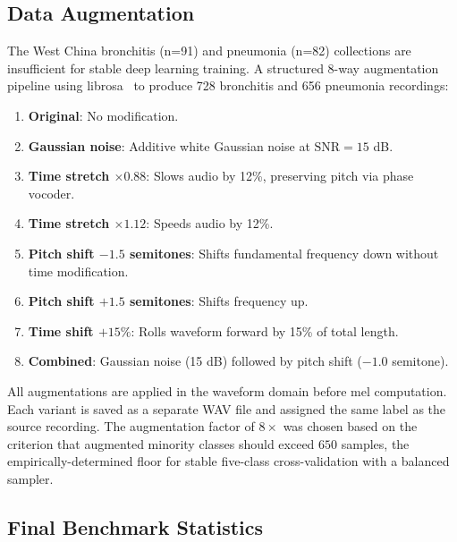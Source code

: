 \documentclass[10pt,journal,compsoc]{IEEEtran}
\begin{document}
\subsection{Data Augmentation}
\label{sec:augmentation}

The West China bronchitis (n=91) and pneumonia (n=82) collections are
insufficient for stable deep learning training. A structured
8-way augmentation pipeline using librosa~\cite{librosa} to produce
728 bronchitis and 656 pneumonia recordings:

\begin{enumerate}[label=(\arabic*)]
    \item \textbf{Original}: No modification.
    \item \textbf{Gaussian noise}: Additive white Gaussian noise at
          $\mathrm{SNR} = 15$ dB.
    \item \textbf{Time stretch $\times 0.88$}: Slows audio by 12\%,
          preserving pitch via phase vocoder.
    \item \textbf{Time stretch $\times 1.12$}: Speeds audio by 12\%.
    \item \textbf{Pitch shift $-1.5$ semitones}: Shifts fundamental
          frequency down without time modification.
    \item \textbf{Pitch shift $+1.5$ semitones}: Shifts frequency up.
    \item \textbf{Time shift $+15\%$}: Rolls waveform forward by 15\%
          of total length.
    \item \textbf{Combined}: Gaussian noise (15 dB) followed by
          pitch shift ($-1.0$ semitone).
\end{enumerate}

All augmentations are applied in the waveform domain before mel computation.
Each variant is saved as a separate WAV file and assigned the same label
as the source recording. The augmentation factor of $8\times$ was chosen
based on the criterion that augmented minority classes should exceed
$650$ samples, the empirically-determined floor for stable five-class
cross-validation with a balanced sampler.

\subsection{Final Benchmark Statistics}
\end{document}
